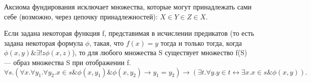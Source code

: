 Аксиома фундирования исключает множества, которые могут принадлежать сами себе (возможно, через цепочку принадлежностей):
$X \in Y \in Z \in X$.

\begin{definition}
Если задана некоторая функция f, представимая в исчислении предикатов
(то есть задана некоторая формула $\phi$, такая, что $f(x) = y$
тогда и только тогда, когда $\phi(x,y) \& \exists ! z \phi(x,z)$),
то для любого множества S существует множество f(S) --- образ
множества S при отображении f.
\[\forall s .(\forall x .\forall y_1 .\forall y_2 .x \in s \& \phi (x,y_1) \& \phi (x,y_2) \rightarrow y_1=y_2) \rightarrow (\exists t .\forall y .y \in t \leftrightarrow \exists x . x \in s \& \phi (x,y)). \]
\end{definition}

